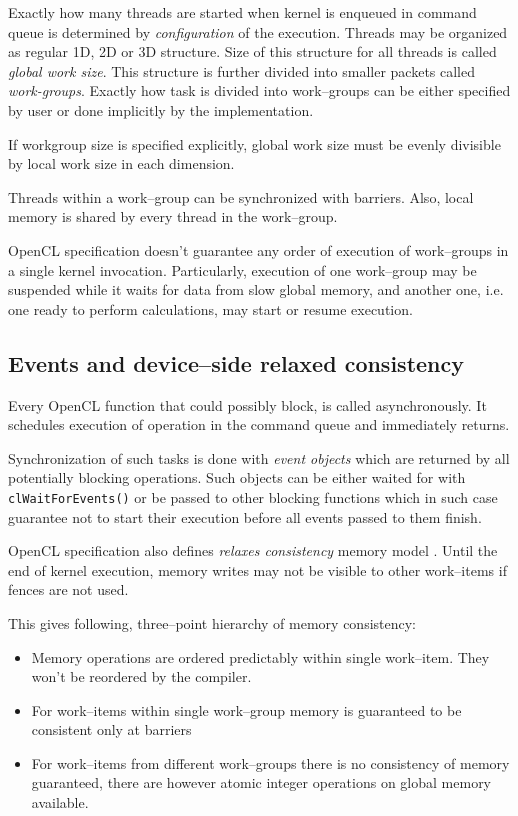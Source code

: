 Exactly how many threads are started when kernel is enqueued in command queue
is determined by \emph{configuration} of the execution. Threads may be organized
as regular 1D, 2D or 3D structure. Size of this structure for all threads is
called \emph{global work size}. This structure is further divided into smaller
packets called \emph{work-groups}. Exactly how task is divided into work--groups
can be either specified by user or done implicitly by the implementation.

If workgroup size is specified explicitly, global work size must be evenly
divisible by local work size in each dimension.

Threads within a work--group can be synchronized with barriers. Also, local
memory is shared by every thread in the work--group.

OpenCL specification doesn't guarantee any order of execution of work--groups
in a single kernel invocation. Particularly, execution of one work--group may be
suspended while it waits for data from slow global memory, and another one,
i.e. one ready to perform calculations, may start or resume execution.

\subsection{Events and device--side relaxed consistency}
\label{sub:clevents}

Every OpenCL function that could possibly block, is called asynchronously. It
schedules execution of operation in the command queue and immediately returns.

Synchronization of such tasks is done with \emph{event objects} which are
returned by all potentially blocking operations. Such objects can be either
waited for with \texttt{clWaitForEvents()} or be passed to other blocking
functions which in such case guarantee not to start their execution before all
events passed to them finish.

OpenCL specification also defines \emph{relaxes consistency} memory model \parencite{gaster2012heterogeneous}.
Until the end of kernel execution, memory writes may not be visible to other
work--items if fences are not used.

This gives following, three--point hierarchy of memory consistency:
\begin{itemize}
  \item Memory operations are ordered predictably within single work--item. They
    won't be reordered by the compiler.
  \item For work--items within single work--group memory is guaranteed to be
    consistent only at barriers
  \item For work--items from different work--groups there is no consistency of
    memory guaranteed, there are however atomic integer operations on global
    memory available.
\end{itemize}

